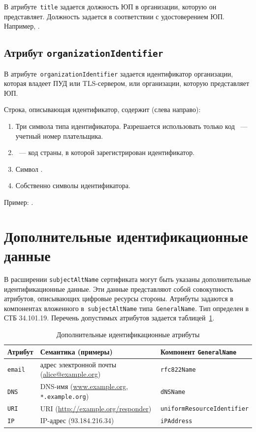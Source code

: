 В атрибуте~\texttt{title} задается должность ЮП в организации, которую он 
представляет. 
%
Должность задается в соответствии с удостоверением ЮП. Например, 
.   

\subsection{Атрибут \texttt{organizationIdentifier}}\label{ENTITIES.Id.ORGID}

В атрибуте~\texttt{organizationIdentifier} задается идентификатор организации,
которая владеет ПУД или TLS-сервером, или организации, которую 
представляет ЮП.

Строка, описывающая идентификатор, содержит (слева направо):
\begin{enumerate}
\item
Три символа типа идентификатора.
Разрешается использовать только код 
~--- учетный номер плательщика.

\item
{}~--- код страны, в которой зарегистрирован идентификатор.

\item
Символ \str{-}.
\item
Собственно символы идентификатора.
\end{enumerate}

Пример: .

\section{Дополнительные идентификационные данные}\label{ENTITIES.SAN}

В расширении \texttt{subjectAltName} сертификата могут быть указаны 
дополнительные идентификационные данные. Эти данные представляют собой 
совокупность атрибутов, описывающих цифровые ресурсы стороны. 
%
Атрибуты задаются в компонентах вложенного в~\texttt{subjectAltName} 
типа~\texttt{GeneralName}. Тип определен в СТБ 34.101.19.
%
Перечень допустимых атрибутов задается таблицей~\ref{Table.ENTITIES.AttrsEx}. 

\begin{table}[bht]
\caption{Дополнительные идентификационные атрибуты}
\label{Table.ENTITIES.AttrsEx}
\begin{tabular}{|l|p{8.9cm}|l|}
\hline
Атрибут & Семантика (примеры) & Компонент \texttt{GeneralName}\\
\hline
\hline
\texttt{email} & 
адрес электронной почты (\url{alice@example.org}) & 
\verb|rfc822Name|\\
%
\texttt{DNS} & 
DNS-имя (\url{www.example.org}, \texttt{*.example.org}) &
\verb|dNSName|\\
%
\texttt{URI} & 
URI (\url{http://example.org/responder}) &
\verb|uniformResourceIdentifier|\\
%
\texttt{IP} & 
IP-адрес (93.184.216.34) &
\verb|iPAddress|\\
\hline                                      
\end{tabular}
\end{table}

